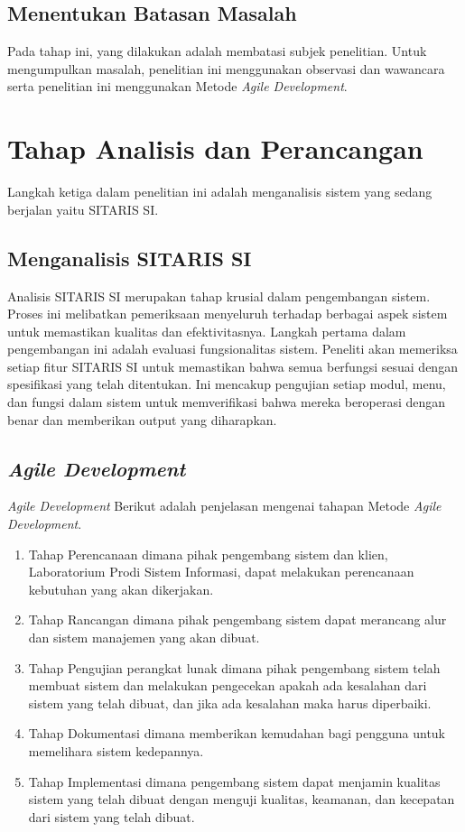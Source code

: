 \subsection{Menentukan Batasan Masalah}
Pada tahap ini, yang dilakukan adalah membatasi subjek penelitian. Untuk mengumpulkan masalah, penelitian ini menggunakan observasi dan wawancara serta penelitian ini menggunakan Metode \textit{Agile Development}.

\section{Tahap Analisis dan Perancangan}
Langkah ketiga dalam penelitian ini adalah menganalisis sistem yang sedang berjalan yaitu SITARIS SI.

\subsection{Menganalisis SITARIS SI}
Analisis SITARIS SI merupakan tahap krusial dalam pengembangan sistem. Proses ini melibatkan pemeriksaan menyeluruh terhadap berbagai aspek sistem untuk memastikan kualitas dan efektivitasnya. Langkah pertama dalam pengembangan ini adalah evaluasi fungsionalitas sistem. Peneliti akan memeriksa setiap fitur SITARIS SI untuk memastikan bahwa semua berfungsi sesuai dengan spesifikasi yang telah ditentukan. Ini mencakup pengujian setiap modul, menu, dan fungsi dalam sistem untuk memverifikasi bahwa mereka beroperasi dengan benar dan memberikan output yang diharapkan.

\subsection{\textit{Agile Development}}
\textit{Agile Development} Berikut adalah penjelasan mengenai tahapan Metode \textit{Agile Development}.
\begin{enumerate}
	\item Tahap Perencanaan dimana pihak pengembang sistem dan klien, Laboratorium Prodi Sistem Informasi, dapat melakukan perencanaan kebutuhan yang akan dikerjakan.
	\item Tahap Rancangan dimana pihak pengembang sistem dapat merancang alur dan sistem manajemen yang akan dibuat.
	\item Tahap Pengujian perangkat lunak dimana pihak pengembang sistem telah membuat sistem dan melakukan pengecekan apakah ada kesalahan dari sistem yang telah dibuat, dan jika ada kesalahan maka harus diperbaiki.
	\item Tahap Dokumentasi dimana memberikan kemudahan bagi pengguna untuk memelihara sistem kedepannya.
	\item Tahap Implementasi dimana pengembang sistem dapat menjamin kualitas sistem yang telah dibuat dengan menguji kualitas, keamanan, dan kecepatan dari sistem yang telah dibuat.
\end{enumerate}

